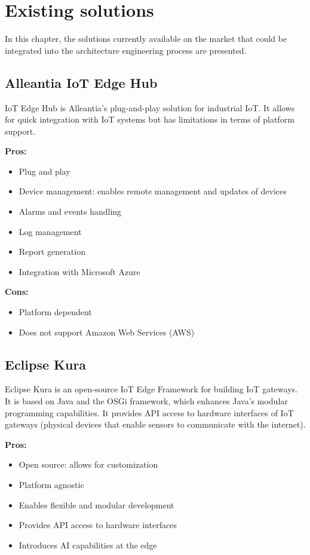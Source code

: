 \chapter{Existing solutions}
\label{cap:existing}
In this chapter, the solutions currently available on the market that could be integrated into the architecture engineering process are presented.

\section{Alleantia IoT Edge Hub}
\label{alleantia}
IoT Edge Hub is Alleantia's\cite{site:alleantia} plug-and-play solution for industrial IoT. It allows for quick integration with IoT systems but has limitations in terms of platform support.

\textbf{Pros:}
\begin{itemize}
    \item Plug and play
    \item Device management: enables remote management and updates of devices
    \item Alarms and events handling
    \item Log management
    \item Report generation
    \item Integration with Microsoft Azure
\end{itemize}

\textbf{Cons:}
\begin{itemize}
    \item Platform dependent
    \item Does not support Amazon Web Services (AWS)
\end{itemize}

\section{Eclipse Kura}
\label{kura}
Eclipse Kura\cite{site:kura} is an open-source IoT Edge Framework for building IoT gateways. It is based on Java and the OSGi framework, which enhances Java’s modular programming capabilities. It provides API access to hardware interfaces of IoT gateways (physical devices that enable sensors to communicate with the internet).

\textbf{Pros:}
\begin{itemize}
    \item Open source: allows for customization
    \item Platform agnostic
    \item Enables flexible and modular development
    \item Provides API access to hardware interfaces
    \item Introduces AI capabilities at the edge
\end{itemize}

